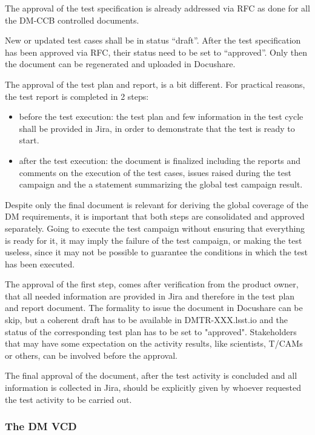 The approval of the test specification is already addressed via RFC as done for all the DM-CCB controlled documents.

New or updated test cases shall be in status ``draft''. After the test specification has been approved via RFC, their status need to be set to ``approved''.
Only then the document can be regenerated and uploaded in Docushare.

The approval of the test plan and report, is a bit different.
For practical reasons, the test report is completed in 2 steps:

\begin{itemize}
\item before the test execution: the test plan and few information in the test cycle shall be provided in Jira, in order to demonstrate that the test is ready to start. 
\item after the test execution: the document is finalized including the reports and comments on the execution of the test cases, issues raised during the test campaign and the a statement summarizing the global test campaign result.
\end{itemize}

Despite only the final document is relevant for deriving the global coverage of the DM requirements, it is important that both steps are consolidated and approved separately. 
Going to execute the test campaign without ensuring that everything is ready for it, it may imply the failure of the test campaign, or making the test useless, since it may not be possible to guarantee the conditions in which the test has been executed.

The approval of the first step, comes after verification from the product owner, that all needed information are provided in Jira and therefore in the test plan and report document. 
The formality to issue the document in Docushare can be skip, but a coherent draft has to be available in DMTR-XXX.lsst.io and the status of the corresponding test plan has to be set to "approved". 
Stakeholders that may have some expectation on the activity results, like scientists, T/CAMs or others, can be involved before the approval.

The final approval of the document, after the test activity is concluded and all information is collected in Jira, should be explicitly given by whoever requested the test activity to be carried out.

\subsubsection{The DM VCD}

